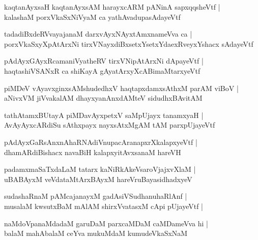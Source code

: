 \documentclass[twoside,12pt,openright]{book}
\newcounter{shloka}[chapter]
\begin{document}
\begin{shloka}%
kaqtanAyxsaH kaqtanAyxsAM harayxcARM pANinA sapxqqsheVtf |\\
kalashaM porxVkaSxNiVyaM ca yathAvadupasAdayeVtf 
\end{shloka}

\begin{shloka}%
tadadiBxdeRVvayajanaM darxvAyxNAyxtAmxnameVva ca |\\
porxVkaSxyXpAtArxNi tirxVNayxdiBxsetxYsetxYdaexRveyxYshacx sAdayeVtf 
\end{shloka}

\begin{shloka}%
pAdAyxGAyxRcamaniVyatheRV tirxVNipAtArxNi dApayeVtf |\\
haqtashiVSANxR ca shiKayA gAyatArxyXcABimaMtarxyeVtf
\end{shloka}

\begin{shloka}%
piMDeV vAyavxginxsAMshudedhxV haqtapxdamxsAthxM parAM viBoV |\\
aNivxVM jiVvakalAM dhayxyanAnxdAMteV sidudhxBAvitAM 
\end{shloka}

\begin{shloka}%
tathAtamxBUtayA piMDavAyxpetxV saMpUjayx tanamxyaH |\\
AvAyAyxcARdiSu sAthxpayx nayxsAtxMgAM tAM  parxpUjayeVtf 
\end{shloka}

\begin{shloka}%
pAdAyxGaRsAnxnAhaRNAdiVnupacAranapxrXkalapxyeVtf |\\
dhamARdiBishacx navaBiH kalapxyitAvxsanaM hareVH
\end{shloka}

\begin{shloka}%
padamxmaSaTxdaLaM tatarx kaNiRkAkeVsaroVjajxvXlaM |\\
uBABAyxM veVdataMtArxBAyxM hareVruBayasidhadxyeV 
\end{shloka}

\begin{shloka}%
sudashaRnaM pAMcajanayxM gadAsiVSudhanuhaRlAnf |\\
musalaM kwsutxBaM mAlAM shirxVvatasxM cApi pUjayeVtf |\\
\end{shloka}

\begin{shloka}%
naMdoVpanaMdadaM garuDaM parxcaMDaM caMDameVva hi |\\
balaM mahAbalaM ceYva mukuMdaM kumudeVkaSxNaM 
\end{shloka}
\end{document}
